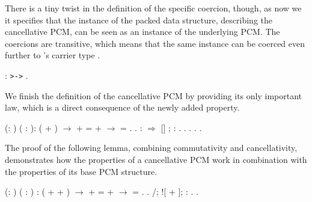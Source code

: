 There is a tiny twist in the definition of the specific coercion,
though, as now we it specifies that the instance of the packed data
structure, describing the cancellative PCM, can be seen as an instance
of the underlying PCM. The coercions are transitive, which means that
the same instance can be coerced even further to 's carrier type
.


\begin{coqdoccode}
\coqdocemptyline
\coqdocnoindent
{}  :  \texttt{>->} .\coqdoceol
\coqdocemptyline
\end{coqdoccode}


We finish the definition of the cancellative PCM by providing its only
important law, which is a direct consequence of the newly added
property.


\begin{coqdoccode}
\coqdocemptyline
\coqdocnoindent
{}  (: ) (  : ): \coqdoceol
\coqdocindent{1.00em}
 ( + ) \ensuremath{\rightarrow}  +  =  +  \ensuremath{\rightarrow}  = .\coqdoceol
\coqdocnoindent
{}.\coqdoceol
\coqdocnoindent
{} :    \ensuremath{\Rightarrow} []   ; : .\coqdoceol
\coqdocnoindent
{}.\coqdoceol
\coqdocemptyline
\coqdocnoindent
{} .\coqdoceol
\coqdocnoindent
{} .\coqdoceol
\coqdocemptyline
\coqdocnoindent
{} .\coqdoceol
\coqdocemptyline
\end{coqdoccode}


The proof of the following lemma, combining commutativity and
cancellativity, demonstrates how the properties of a cancellative PCM
work in combination with the properties of its base PCM structure.


\begin{coqdoccode}
\coqdocemptyline
\coqdocnoindent
{}  (: ) (   : ) :\coqdoceol
\coqdocindent{1.00em}
 ( +  + ) \ensuremath{\rightarrow}  +  =  +  \ensuremath{\rightarrow}  = .\coqdoceol
\coqdocnoindent
{}.\coqdoceol
\coqdocnoindent
{} /;  ![ + \coqdocvar{\_}]; : .\coqdoceol
\coqdocnoindent
{}.\coqdoceol
\coqdocemptyline
\end{coqdoccode}


